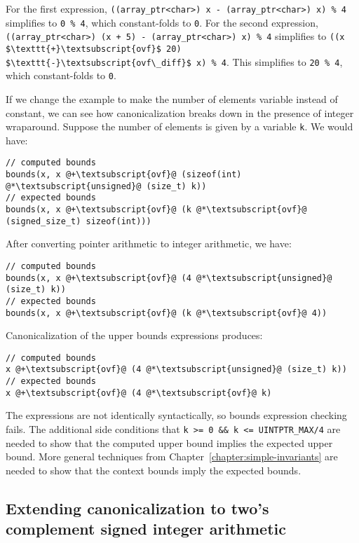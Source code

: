 For the first expression, \lstinline|((array_ptr<char>) x - (array_ptr<char>) x) % 4|
simplifies to \lstinline|0 % 4|, which constant-folds to \lstinline|0|.
For the second expression, \lstinline|((array_ptr<char>) (x + 5) - (array_ptr<char>) x) % 4|
simplifies to
\lstinline[mathescape]|((x $\texttt{+}\textsubscript{ovf}$ 20) $\texttt{-}\textsubscript{ovf\_diff}$ x) % 4|.
This simplifies to \lstinline|20 % 4|, which constant-folds to \lstinline|0|.

If we change the example to make the number of elements variable instead
of constant, we can see how canonicalization breaks down in the presence
of integer wraparound. Suppose the number of elements is given by a
variable \lstinline|k|. We would have:

\begin{lstlisting}[escapechar=\@]
// computed bounds
bounds(x, x @+\textsubscript{ovf}@ (sizeof(int) @*\textsubscript{unsigned}@ (size_t) k))
// expected bounds
bounds(x, x @+\textsubscript{ovf}@ (k @*\textsubscript{ovf}@ (signed_size_t) sizeof(int)))
\end{lstlisting}

After converting pointer arithmetic to integer arithmetic, we have:
\begin{lstlisting}[escapechar=\@]
// computed bounds
bounds(x, x @+\textsubscript{ovf}@ (4 @*\textsubscript{unsigned}@ (size_t) k))
// expected bounds
bounds(x, x @+\textsubscript{ovf}@ (k @*\textsubscript{ovf}@ 4))
\end{lstlisting}

Canonicalization of the upper bounds expressions produces:
\begin{lstlisting}[escapechar=\@]
// computed bounds
x @+\textsubscript{ovf}@ (4 @*\textsubscript{unsigned}@ (size_t) k))
// expected bounds
x @+\textsubscript{ovf}@ (4 @*\textsubscript{ovf}@ k)
\end{lstlisting}

The expressions are not identically syntactically, so bounds expression
checking fails. The additional side conditions that \lstinline|k >= 0 && k <= UINTPTR_MAX/4|
are needed to show that the computed upper bound implies the expected upper bound. More
general techniques from Chapter~\ref{chapter:simple-invariants} are needed to show that the context
bounds imply the expected bounds.

\subsection{Extending canonicalization to two's complement signed integer arithmetic}

